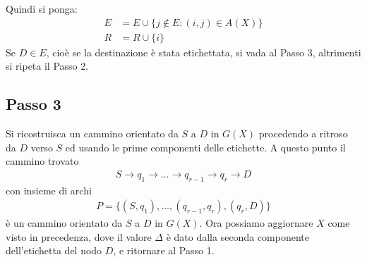 Quindi si ponga:
\begin{align}
  E &= E \cup \{j \notin E : (i, j) \in A(X)\} \\
  R &= R \cup \{i\}
\end{align}
Se $D \in E$, cioè se la destinazione è stata etichettata, si vada al Passo 3, altrimenti si ripeta il Passo 2.

\subsection*{Passo 3}
Si ricostruisca un cammino orientato da $S$ a $D$ in $G(X)$ procedendo a ritroso da $D$ verso $S$ ed usando le prime componenti delle etichette. A questo punto il cammino trovato
\begin{align}
S \to q_1 \to \ldots \to q_{r-1} \to q_r \to D
\end{align}
con insieme di archi
\begin{align}
P = \{(S, q_1), \ldots, (q_{r-1}, q_r), (q_r, D)\}
\end{align}
è un cammino orientato da $S$ a $D$ in $G(X)$.
Ora possiamo aggiornare $X$ come visto in precedenza, dove il valore $\Delta$ è dato dalla seconda componente dell'etichetta del nodo $D$, e ritornare al Passo 1.



